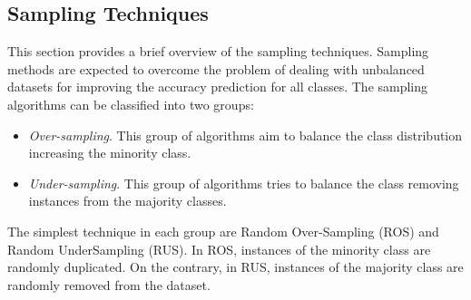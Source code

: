 \documentclass{elsart}
\begin{document}



\subsection{Sampling Techniques}

This section provides a brief overview of the sampling techniques. Sampling methods are expected to overcome the problem of dealing with unbalanced datasets for improving the accuracy prediction  for all classes. The sampling algorithms can be classified into two groups:

\begin{itemize}

  \item \emph{Over-sampling}. This group of algorithms aim to balance the class distribution increasing the minority class.

  \item \emph{Under-sampling}. This group of algorithms tries to balance the class removing instances from the majority classes.

\end{itemize}

The simplest technique in each group are Random Over-Sampling (ROS) and Random UnderSampling (RUS). In ROS, instances of the minority class are randomly duplicated. On the contrary, in RUS, instances of the majority class are randomly removed from the dataset.
\end{document}
